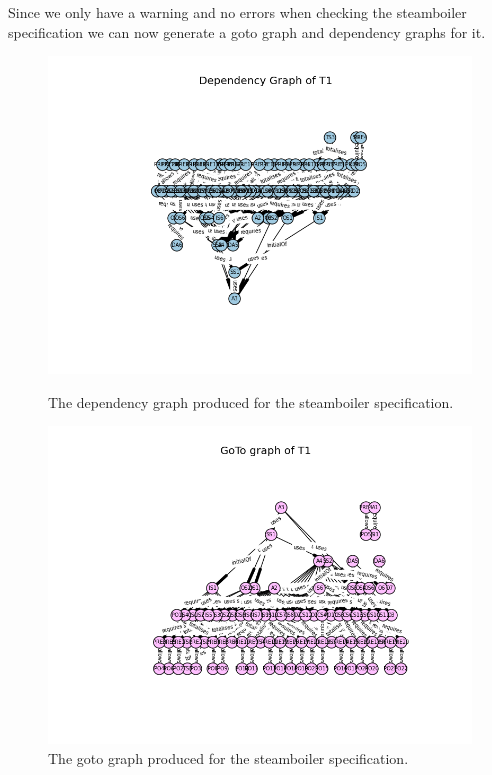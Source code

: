 Since we only have a warning and no errors when checking the steamboiler
specification we can now generate a goto graph and dependency graphs for it.

\begin{figure}[H]
\centering
\begin{minipage}{0.45\textwidth}
\centering
\includegraphics[trim=4cm 1cm 1cm 1cm, scale=0.5]{examples/steamboiler/25a.png}
\vspace{-0.18in}
\caption{The dependency graph produced for the steamboiler specification. \label{fig:steamdepgraph}}
\vspace{-0.2in}
\end{minipage}\hfill
\begin{minipage}{0.43\textwidth}
\centering
\includegraphics[trim=4cm 1cm 1cm 1cm, scale=0.5]{examples/steamboiler/25b.png}
\vspace{-0.2in}
\caption{The goto graph produced for the steamboiler specification. \label{fig:steamgotograph}}
\vspace{-0.2in}
\end{minipage}
\end{figure}

